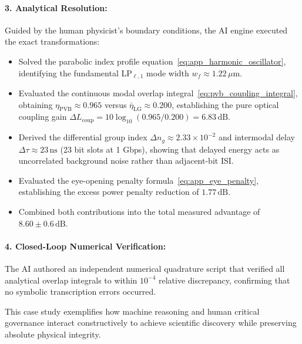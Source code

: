 \documentclass[11pt,a4paper]{article}
\begin{document}
\paragraph{3. Analytical Resolution:}
Guided by the human physicist's boundary conditions, the AI engine executed the exact transformations:
\begin{itemize}
    \item Solved the parabolic index profile equation~\eqref{eq:app_harmonic_oscillator}, identifying the fundamental LP$_{\ell, 1}$ mode width $w_f \approx 1.22\,\mu\text{m}$.
    \item Evaluated the continuous modal overlap integral~\eqref{eq:pvb_coupling_integral}, obtaining $\eta_{\text{PVB}} \approx 0.965$ versus $\bar{\eta}_{\text{LG}} \approx 0.200$, establishing the pure optical coupling gain $\Delta L_{\text{coup}} = 10 \log_{10}(0.965 / 0.200) = 6.83\,\text{dB}$.
    \item Derived the differential group index $\Delta n_g \approx 2.33 \times 10^{-2}$ and intermodal delay $\Delta \tau \approx 23\,\text{ns}$ (23 bit slots at 1 Gbps), showing that delayed energy acts as uncorrelated background noise rather than adjacent-bit ISI.
    \item Evaluated the eye-opening penalty formula~\eqref{eq:app_eye_penalty}, establishing the excess power penalty reduction of $1.77\,\text{dB}$.
    \item Combined both contributions into the total measured advantage of $8.60 \pm 0.6\,\text{dB}$.
\end{itemize}

\paragraph{4. Closed-Loop Numerical Verification:}
The AI authored an independent numerical quadrature script that verified all analytical overlap integrals to within $10^{-4}$ relative discrepancy, confirming that no symbolic transcription errors occurred.

This case study exemplifies how machine reasoning and human critical governance interact constructively to achieve scientific discovery while preserving absolute physical integrity.




\end{document}
